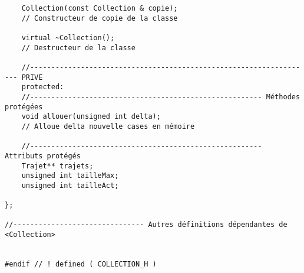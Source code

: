 \begin{verbatim}
    Collection(const Collection & copie);
    // Constructeur de copie de la classe
    
    virtual ~Collection();
    // Destructeur de la classe
    
    //------------------------------------------------------------------- PRIVE
    protected:
    //------------------------------------------------------- Méthodes protégées
    void allouer(unsigned int delta);
    // Alloue delta nouvelle cases en mémoire
    
    //------------------------------------------------------- Attributs protégés
    Trajet** trajets;
    unsigned int tailleMax;
    unsigned int tailleAct;
    
};

//------------------------------- Autres définitions dépendantes de <Collection>


#endif // ! defined ( COLLECTION_H )
\end{verbatim}
